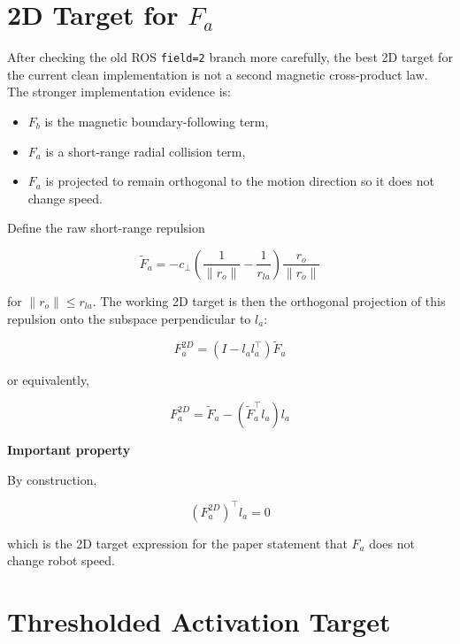 \documentclass[11pt]{article}
\begin{document}
\section*{2D Target for \(F_a\)}

After checking the old ROS \texttt{field=2} branch more carefully, the best 2D
target for the current clean implementation is not a second magnetic
cross-product law. The stronger implementation evidence is:

\begin{itemize}[leftmargin=*]
  \item \(F_b\) is the magnetic boundary-following term,
  \item \(F_a\) is a short-range radial collision term,
  \item \(F_a\) is projected to remain orthogonal to the motion direction so it
  does not change speed.
\end{itemize}

Define the raw short-range repulsion

\begin{equation}
\tilde{F}_a
=
-c_\perp
\left(
\frac{1}{\lVert r_o \rVert} - \frac{1}{r_{la}}
\right)
\frac{r_o}{\lVert r_o \rVert}
\end{equation}

for \(\lVert r_o \rVert \le r_{la}\). The working 2D target is then the
orthogonal projection of this repulsion onto the subspace perpendicular to
\(l_a\):

\begin{equation}
F_a^{2D}
=
\left(I - l_a l_a^\top \right)\tilde{F}_a
\end{equation}

or equivalently,

\begin{equation}
F_a^{2D}
=
\tilde{F}_a - \left(\tilde{F}_a^\top l_a\right)l_a
\end{equation}

\textbf{Important property}

By construction,

\begin{equation}
(F_a^{2D})^\top l_a = 0
\end{equation}

which is the 2D target expression for the paper statement that \(F_a\) does not
change robot speed.

\section*{Thresholded Activation Target}
\end{document}
